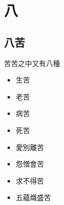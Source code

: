\section{八}

\subsection{八苦}
苦苦之中又有八種
\begin{itemize}
  \item 生苦
  \item 老苦
  \item 病苦
  \item 死苦
  \item 愛別離苦
  \item 怨憎會苦
  \item 求不得苦
  \item 五蘊熾盛苦
\end{itemize}
